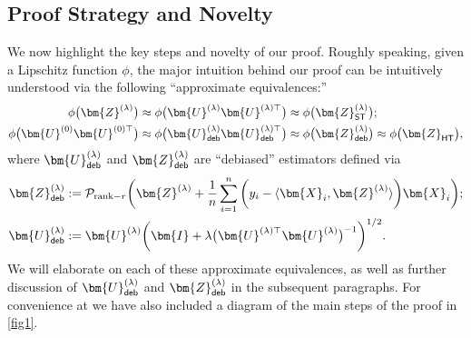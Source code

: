\documentclass[10pt]{article}
\newcommand{\inv}{^{-1}}
\theoremstyle{definition}
\begin{document}
\subsection{Proof Strategy and Novelty} \label{sec:proofstrategy}
We now highlight the key steps and novelty of our proof. 
Roughly speaking, given a Lipschitz function $\phi$, the major intuition behind our proof can be intuitively understood via the following ``approximate equivalences:''
\begin{align}
\phi\big(\bm{Z}^{(\lambda)}\big) &\approx \phi\big(\bm{U}^{(\lambda)} \bm{U}^{(\lambda)\top}\big) \approx  \phi\big(\bm{Z}_{{\sf ST}}^{(\lambda)}\big); \\
    \phi\big(\bm{U}^{(0)} \bm{U}^{(0)\top} \big)&\approx \phi\big(\bm{U}^{(\lambda)}_{{\sf deb}}\bm{U}^{(\lambda)\top}_{{\sf deb}} \big)\approx \phi\big(\bm{Z}^{(\lambda)}_{{\sf deb}}\big) \approx \phi\big(\bm{Z}_{{\sf HT}}\big),
    \end{align}
    where $\bm{U}^{(\lambda)}_{{\sf deb}}$ and $\bm{Z}_{{\sf deb}}^{(\lambda)}$ are ``debiased'' estimators  defined via 
 \begin{align}
     \bm{Z}_{{\sf deb}}^{(\lambda)} &:= \mathcal{P}_{{\mathrm{rank}-r}} \bigg( \bm{Z}^{(\lambda)} + \frac{1}{n} \sum_{i=1}^{n} \bigg( y_i - \langle \bm{X}_i, \bm{Z}^{(\lambda)} \rangle \bigg) \bm{X}_i \bigg); \\
     \bm{U}_{{\sf deb}}^{(\lambda)} &:= \bm{U}^{(\lambda)} \bigg( \bm{I} + \lambda \big( \bm{U}^{(\lambda)\top} \bm{U}^{(\lambda)} \big)\inv \bigg)^{1/2}.
 \end{align}
      We will elaborate on each of these approximate equivalences, as well as further discussion of $\bm{U}_{{\sf deb}}^{(\lambda)}$ and $\bm{Z}_{{\sf deb}}^{(\lambda)}$ in the subsequent paragraphs.   For convenience at  we have also included a diagram of the main steps of the proof in \cref{fig1}. %



    
\end{document}
